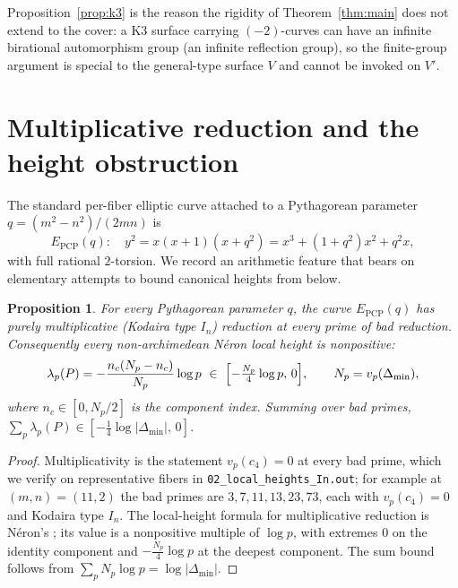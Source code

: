 \documentclass[11pt,reqno]{amsart}
\theoremstyle{plain}
\newtheorem{proposition}[theorem]{Proposition}
\theoremstyle{definition}
\theoremstyle{remark}
\newcommand{\EPCP}{E_{\mathrm{PCP}}}
\begin{document}
Proposition~\ref{prop:k3} is the reason the rigidity of Theorem~\ref{thm:main} does
not extend to the cover: a K3 surface carrying $(-2)$-curves can have an infinite
birational automorphism group (an infinite reflection group), so the finite-group
argument is special to the general-type surface $V$ and cannot be invoked on $V'$.

\section{Multiplicative reduction and the height obstruction}\label{sec:heights}

The standard per-fiber elliptic curve attached to a Pythagorean parameter
$q=(m^2-n^2)/(2mn)$ is
\[
\EPCP(q):\quad y^2=x(x+1)(x+q^2)=x^3+(1+q^2)x^2+q^2x ,
\]
with full rational $2$-torsion. We record an arithmetic feature that bears on
elementary attempts to bound canonical heights from below.

\begin{proposition}\label{prop:mult}
For every Pythagorean parameter $q$, the curve $\EPCP(q)$ has purely multiplicative
(Kodaira type $I_n$) reduction at every prime of bad reduction. Consequently every
non-archimedean N\'eron local height is nonpositive:
\[
\lambda_p(P)=-\frac{n_c(N_p-n_c)}{N_p}\log p\ \in\ \Bigl[-\tfrac{N_p}{4}\log p,\,0\Bigr],
\qquad N_p=v_p(\Delta_{\min}),
\]
where $n_c\in[0,N_p/2]$ is the component index. Summing over bad primes,
$\sum_p\lambda_p(P)\in[-\tfrac14\log|\Delta_{\min}|,\,0]$.
\end{proposition}

\begin{proof}
Multiplicativity is the statement $v_p(c_4)=0$ at every bad prime, which we verify on
representative fibers in \texttt{02\_local\_heights\_In.out}; for example at
$(m,n)=(11,2)$ the bad primes are $3,7,11,13,23,73$, each with $v_p(c_4)=0$ and
Kodaira type $I_n$. The local-height formula for multiplicative reduction is N\'eron's
\cite[Ch.~VI]{SilvermanATAEC}; its value is a nonpositive multiple of $\log p$, with
extremes $0$ on the identity component and $-\tfrac{N_p}{4}\log p$ at the deepest
component. The sum bound follows from $\sum_p N_p\log p=\log|\Delta_{\min}|$.
\end{proof}
\end{document}
